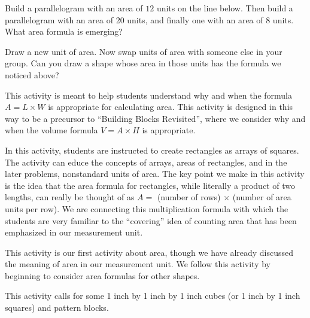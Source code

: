 \documentclass{ximera}
\begin{document}
\begin{problem}
Build a parallelogram with an area of $12$ units on the line below.  Then build a parallelogram with an area of 20 units, and finally one with an area of 8 units.  What area formula is emerging?

\vspace{6.5cm}

\end{problem}

\begin{problem}
Draw a new unit of area.  Now swap units of area with someone else in your group.  Can you draw a shape whose area in those units has the formula we noticed above?

\end{problem}

\newpage
\begin{instructorNotes}
This activity is meant to help students understand why and when the formula $A = L \times W$ is appropriate for calculating area.  This activity is designed in this way to be a precursor to ``Building Blocks Revisited'', where we consider why and when the volume formula $V = A \times H$ is appropriate.  

In this activity, students are instructed to create rectangles as arrays of squares.  The activity can educe the concepts of arrays, areas of rectangles, and in the later problems, nonstandard units of area.  The key point we make in this activity is the idea that the area formula for rectangles, while literally a product of two lengths, can really be thought of as $A = $ (number of rows) $\times$ (number of area units per row).  We are connecting this multiplication formula with which the students are very familiar to the ``covering'' idea of counting area that has been emphasized in our measurement unit.

This activity is our first activity about area, though we have already discussed the meaning of area in our measurement unit.  We follow this activity by beginning to consider area formulas for other shapes.

This activity calls for some 1 inch by 1 inch by 1 inch cubes (or 1 inch by 1 inch squares) and pattern blocks.




\end{instructorNotes}
\end{document}
